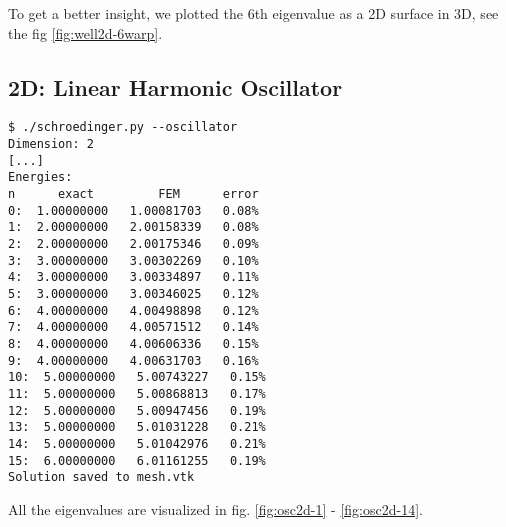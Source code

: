 





To get a better insight, we plotted the 6th eigenvalue as a 2D surface in 3D,
see the fig \ref{fig:well2d-6warp}.


\subsection{2D: Linear Harmonic Oscillator}

\begin{lstlisting}
$ ./schroedinger.py --oscillator
Dimension: 2
[...]
Energies:
n      exact         FEM      error
0:  1.00000000   1.00081703   0.08%
1:  2.00000000   2.00158339   0.08%
2:  2.00000000   2.00175346   0.09%
3:  3.00000000   3.00302269   0.10%
4:  3.00000000   3.00334897   0.11%
5:  3.00000000   3.00346025   0.12%
6:  4.00000000   4.00498898   0.12%
7:  4.00000000   4.00571512   0.14%
8:  4.00000000   4.00606336   0.15%
9:  4.00000000   4.00631703   0.16%
10:  5.00000000   5.00743227   0.15%
11:  5.00000000   5.00868813   0.17%
12:  5.00000000   5.00947456   0.19%
13:  5.00000000   5.01031228   0.21%
14:  5.00000000   5.01042976   0.21%
15:  6.00000000   6.01161255   0.19%
Solution saved to mesh.vtk
\end{lstlisting}

All the eigenvalues are visualized in fig. \ref{fig:osc2d-1} -
\ref{fig:osc2d-14}.






